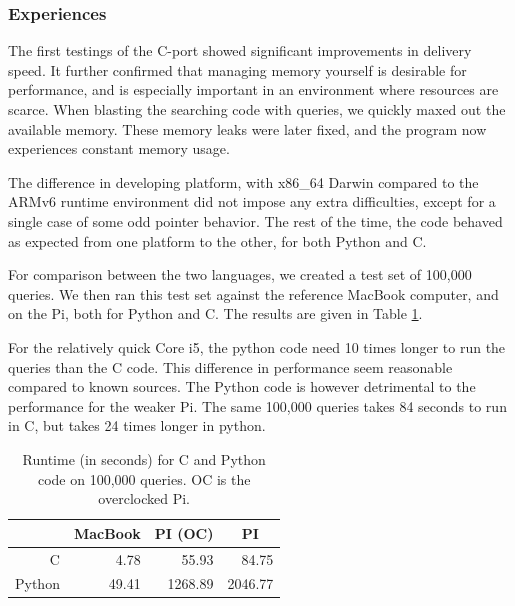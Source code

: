 \subsubsection{Experiences}
The first testings of the C-port showed significant improvements in delivery speed.
It further confirmed that managing memory yourself is desirable for performance, and is especially important in an environment where resources are scarce.
When blasting the searching code with queries, we quickly maxed out the available memory.
These memory leaks were later fixed, and the program now experiences constant memory usage.

The difference in developing platform, with x86\_64 Darwin compared to the ARMv6 runtime environment did not impose any extra difficulties, except for a single case of some odd pointer behavior.
The rest of the time, the code behaved as expected from one platform to the other, for both Python and C.

For comparison between the two languages, we created a test set of 100,000 queries. We then ran this test set against the reference MacBook computer, and on the Pi, both for Python and {C}.
The results are given in Table \ref{tbl:runtimes_ports}.

For the relatively quick {Core i5}, the python code need 10 times longer to run the queries than the C code. This difference in performance seem reasonable compared to known sources.
The Python code is however detrimental to the performance for the weaker Pi. The same 100,000 queries takes 84 seconds to run in C, but takes 24 times longer in python.

\begin{table}[h]
	\begin{center}
	\begin{tabular}{|r|r|r|r|}
	\hline
	   & \multicolumn{1}{|c|}{MacBook} & \multicolumn{1}{|c|}{PI (OC)}  & \multicolumn{1}{|c|}{PI} \\
	\hline
	C      & 4.78 & 55.93 & 84.75     \\
	\hline
	Python & 49.41 & 1268.89 & 2046.77   \\

	\hline
	\end{tabular}
	\caption{Runtime (in seconds) for C and Python code on 100,000 queries. OC is the overclocked Pi.}
	\label{tbl:runtimes_ports}
	\end{center}
\end{table}
